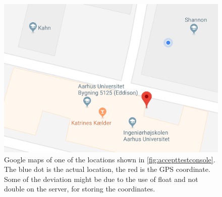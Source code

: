 \begin{figure}
	\centering
	\includegraphics[width=0.7\linewidth]{gfx/Test/AcceptTestMaps.png}
	\caption{Google maps of one of the locations shown in \cref{fig:accepttestconsole}. The blue dot is the actual location, the red is the GPS coordinate. Some of the deviation might be due to the use of float and not double on the server, for storing the coordinates.}
	\label{fig:accepttestmaps}
\end{figure}


\FloatBarrier